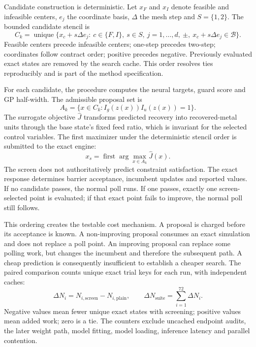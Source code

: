 \documentclass[10pt]{article}
\begin{document}
Candidate construction is deterministic. Let $x_F$ and $x_I$ denote feasible and infeasible centers, $e_j$ the coordinate basis, $\Delta$ the mesh step and $S=\{1,2\}$. The bounded candidate stencil is
\begin{equation}
 C_k=\operatorname{unique}\{x_c+s\Delta e_j:\ c\in\{F,I\},\ s\in S,\ j=1,\ldots,d,\ \pm,\ x_c+s\Delta e_j\in\mathcal{B}\}.
\end{equation}
Feasible centers precede infeasible centers; one-step precedes two-step; coordinates follow contract order; positive precedes negative. Previously evaluated exact states are removed by the search cache. This order resolves ties reproducibly and is part of the method specification.

For each candidate, the procedure computes the neural targets, guard score and GP half-width. The admissible proposal set is
\begin{equation}
 A_k=\{x\in C_k:I_g(z(x))I_u(z(x))=1\}.
\end{equation}
The surrogate objective $\widehat J$ transforms predicted recovery into recovered-metal units through the base state's fixed feed ratio, which is invariant for the selected control variables. The first maximizer under the deterministic stencil order is submitted to the exact engine:
\begin{equation}
 x_s=\operatorname{first}\arg\max_{x\in A_k}\widehat J(x).
\end{equation}
The screen does not authoritatively predict constraint satisfaction. The exact response determines barrier acceptance, incumbent updates and reported values. If no candidate passes, the normal poll runs. If one passes, exactly one screen-selected point is evaluated; if that exact point fails to improve, the normal poll still follows.

This ordering creates the testable cost mechanism. A proposal is charged before its acceptance is known. A non-improving proposal consumes an exact simulation and does not replace a poll point. An improving proposal can replace some polling work, but changes the incumbent and therefore the subsequent path. A cheap prediction is consequently insufficient to establish a cheaper search. The paired comparison counts unique exact trial keys for each run, with independent caches:
\begin{equation}
 \Delta N_i=N_{i,\mathrm{screen}}-N_{i,\mathrm{plain}},\qquad
 \Delta N_{\mathrm{suite}}=\sum_{i=1}^{72}\Delta N_i.
\end{equation}
Negative values mean fewer unique exact states with screening; positive values mean added work; zero is a tie. The counters exclude uncached endpoint audits, the later weight path, model fitting, model loading, inference latency and parallel contention.
\end{document}
